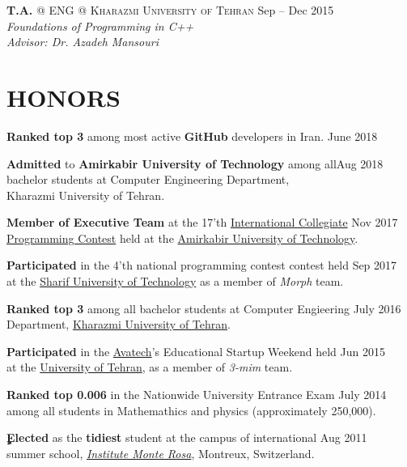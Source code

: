 \documentclass[margin, 10pt]{res} %
\begin{document}
\begin{resume}
   \textbf{T.A.} \textsc{@}
   \textsc{ENG} \textsc{@} \textsc{Kharazmi University of Tehran}
   \hfill {Sep -- Dec 2015}\\
   \textit{Foundations of Programming in C++}\\
   \textit{Advisor: Dr. Azadeh Mansouri}
   \href{https://github.com/aligholamee/Foundations-of-Programming}{\hfill\UrlFont[Resources]}

	\section{HONORS}
	
	\textbf{Ranked top 3} among most active \textbf{GitHub} developers in Iran. \hfill {June 2018}
	
	\textbf{Admitted} to 
	\textbf{Amirkabir University of Technology}
	among all\hfill {Aug 2018}\\ bachelor students at Computer Engineering 
	Department,\\ Kharazmi University of Tehran.
	
	\textbf{Member of Executive Team}
	at the 17'th \href{https://icpc.baylor.edu/regionals/finder/tehran-2017}{International Collegiate} \hfill {Nov 2017}\\  \href{https://icpc.baylor.edu/regionals/finder/tehran-2017}{Programming Contest} held at the \href{http://ceit.aut.ac.ir}{Amirkabir University of Technology}.
	
	\textbf{Participated}
	in the 4'th national programming contest contest held \hfill {Sep 2017}\\at the \href{http://sharif.ir}{Sharif University of Technology} as a member of \textit{Morph} team.

	\textbf{Ranked top 3}
	among all bachelor students at Computer Engieering \hfill {July 2016}\\ Department, \href{http://khu.ac.ir}{Kharazmi University of Tehran}.
	
	\textbf{Participated}
	in the \href{http://avatech.ir}{Avatech}'s Educational Startup Weekend held \hfill {Jun 2015}\\at the \href{http://ut.ac.ir}{University of Tehran}, as a member of \textit{3-mim} team.
	
	\textbf{Ranked top 0.006}
	in the Nationwide University Entrance Exam \hfill {July 2014}\\ among all students in 
	Mathemathics and physics (approximately 250,000).
	
	\textbf{ٍElected}
	as the \textbf{tidiest} student at the campus of international \hfill {Aug 2011}\\ summer school, \textit{\href{https://www.monterosa.ch/}{Institute Monte Rosa}}, Montreux, Switzerland. 
    \end{resume}
\end{document}
